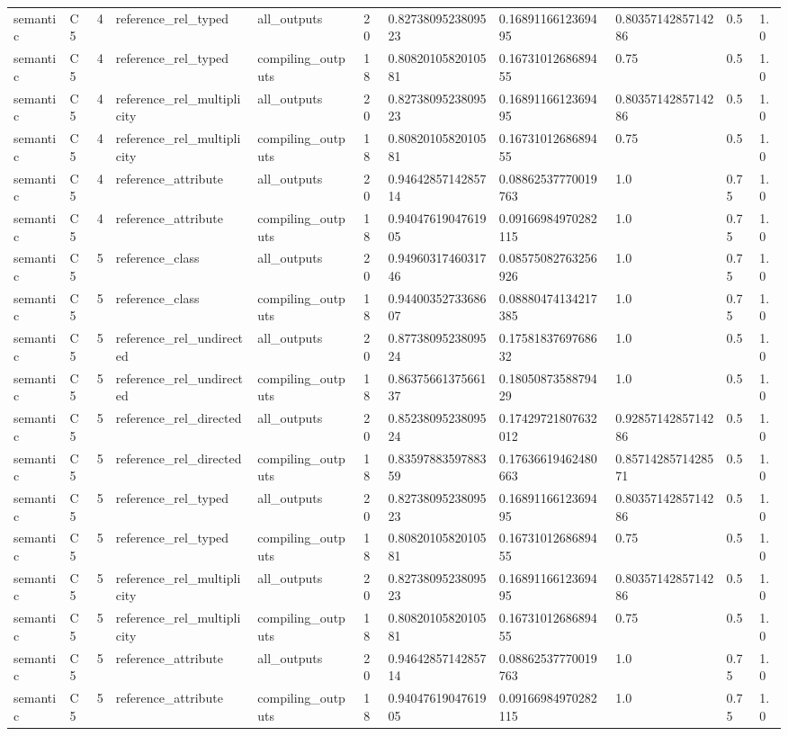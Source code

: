 \begin{tabular}{lllllllllll}
semantic & C5 & 4 & reference\_rel\_typed & all\_outputs & 20 & 0.8273809523809523 & 0.1689116612369495 & 0.8035714285714286 & 0.5 & 1.0 \\
semantic & C5 & 4 & reference\_rel\_typed & compiling\_outputs & 18 & 0.8082010582010581 & 0.1673101268689455 & 0.75 & 0.5 & 1.0 \\
semantic & C5 & 4 & reference\_rel\_multiplicity & all\_outputs & 20 & 0.8273809523809523 & 0.1689116612369495 & 0.8035714285714286 & 0.5 & 1.0 \\
semantic & C5 & 4 & reference\_rel\_multiplicity & compiling\_outputs & 18 & 0.8082010582010581 & 0.1673101268689455 & 0.75 & 0.5 & 1.0 \\
semantic & C5 & 4 & reference\_attribute & all\_outputs & 20 & 0.9464285714285714 & 0.08862537770019763 & 1.0 & 0.75 & 1.0 \\
semantic & C5 & 4 & reference\_attribute & compiling\_outputs & 18 & 0.9404761904761905 & 0.09166984970282115 & 1.0 & 0.75 & 1.0 \\
semantic & C5 & 5 & reference\_class & all\_outputs & 20 & 0.9496031746031746 & 0.08575082763256926 & 1.0 & 0.75 & 1.0 \\
semantic & C5 & 5 & reference\_class & compiling\_outputs & 18 & 0.9440035273368607 & 0.08880474134217385 & 1.0 & 0.75 & 1.0 \\
semantic & C5 & 5 & reference\_rel\_undirected & all\_outputs & 20 & 0.8773809523809524 & 0.1758183769768632 & 1.0 & 0.5 & 1.0 \\
semantic & C5 & 5 & reference\_rel\_undirected & compiling\_outputs & 18 & 0.8637566137566137 & 0.1805087358879429 & 1.0 & 0.5 & 1.0 \\
semantic & C5 & 5 & reference\_rel\_directed & all\_outputs & 20 & 0.8523809523809524 & 0.17429721807632012 & 0.9285714285714286 & 0.5 & 1.0 \\
semantic & C5 & 5 & reference\_rel\_directed & compiling\_outputs & 18 & 0.8359788359788359 & 0.17636619462480663 & 0.8571428571428571 & 0.5 & 1.0 \\
semantic & C5 & 5 & reference\_rel\_typed & all\_outputs & 20 & 0.8273809523809523 & 0.1689116612369495 & 0.8035714285714286 & 0.5 & 1.0 \\
semantic & C5 & 5 & reference\_rel\_typed & compiling\_outputs & 18 & 0.8082010582010581 & 0.1673101268689455 & 0.75 & 0.5 & 1.0 \\
semantic & C5 & 5 & reference\_rel\_multiplicity & all\_outputs & 20 & 0.8273809523809523 & 0.1689116612369495 & 0.8035714285714286 & 0.5 & 1.0 \\
semantic & C5 & 5 & reference\_rel\_multiplicity & compiling\_outputs & 18 & 0.8082010582010581 & 0.1673101268689455 & 0.75 & 0.5 & 1.0 \\
semantic & C5 & 5 & reference\_attribute & all\_outputs & 20 & 0.9464285714285714 & 0.08862537770019763 & 1.0 & 0.75 & 1.0 \\
semantic & C5 & 5 & reference\_attribute & compiling\_outputs & 18 & 0.9404761904761905 & 0.09166984970282115 & 1.0 & 0.75 & 1.0 \\
\end{tabular}